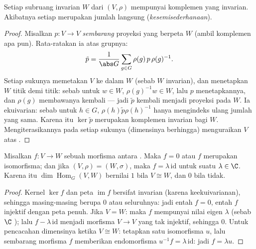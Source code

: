 \begin{theorem}[Maschke]\label{thm:b3:representations:maschke}
Setiap subruang invarian $W$ dari  $(V, \rho)$
mempunyai komplemen yang invarian. Akibatnya setiap 
merupakan jumlah langsung 
(\emph{kesemisederhanaan}).
\end{theorem}

\begin{proof}
Misalkan $p \colon V \to V$ \emph{sembarang} proyeksi yang berpeta $W$
(ambil komplemen apa pun). Rata-ratakan ia atas grupnya:
\[
\tilde p = \frac1{\abs G}\sum_{g \in G} \rho(g)\,p\,\rho(g)^{-1}.
\]
Setiap sukunya memetakan $V$ ke dalam $W$ (sebab $W$ invarian), dan menetapkan $W$
titik demi titik: sebab untuk $w \in W$, $\rho(g)^{-1}w \in W$, lalu $p$ menetapkannya,
dan $\rho(g)$ membawanya kembali --- jadi $\tilde p$ kembali menjadi
proyeksi pada $W$. Ia ekuivarian: sebab untuk $h \in G$,
$\rho(h)\tilde p\rho(h)^{-1}$ hanya mengindeks ulang jumlah yang sama. Karena itu $\ker
\tilde p$ merupakan komplemen invarian bagi $W$. Mengiterasikannya pada
setiap sukunya (dimensinya berhingga) menguraikan $V$ atas .
\end{proof}

\begin{theorem}\label{thm:b3:representations:schur}
Misalkan $f \colon V \to W$ sebuah morfisma antara  \emph{}. Maka $f = 0$ atau $f$ merupakan isomorfisma; dan jika
$(V,\rho) = (W,\sigma)$, maka $f = \lambda\,\mathrm{id}$ untuk suatu
$\lambda \in \C$. Karena itu
$\dim\operatorname{Hom}_G(V, W)$ bernilai $1$ bila $V \cong W$, dan $0$
bila tidak.
\end{theorem}

\begin{proof}
Kernel $\ker f$ dan peta $\operatorname{im} f$ bersifat invarian (karena keekuivarianan),
sehingga masing-masing berupa $0$ atau seluruhnya: jadi entah $f = 0$, entah $f$ injektif
dengan peta penuh. Jika $V = W$: maka $f$ mempunyai nilai eigen $\lambda$ (sebab $\C$
); lalu $f - \lambda\,\mathrm{id}$ menjadi morfisma
$V \to V$ yang tak injektif, sehingga $0$. Untuk pencacahan dimensinya
ketika $V \cong W$: tetapkan satu isomorfisma $u$, lalu sembarang morfisma
$f$ memberikan endomorfisma $u^{-1}f = \lambda\,\mathrm{id}$: jadi $f =
\lambda u$.
\end{proof}

